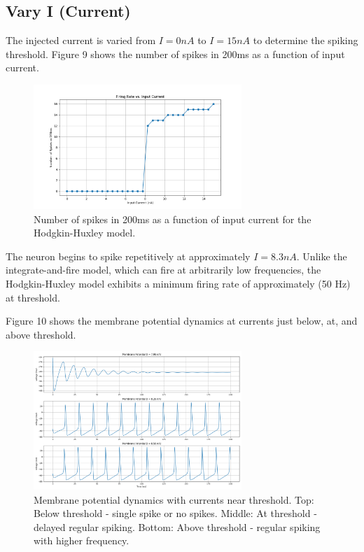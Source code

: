 \documentclass[11pt,a4paper]{article}
\begin{document}
\subsection{Vary I (Current)}

The injected current is varied from $I = 0nA$ to $I = 15nA$ to determine the spiking threshold. Figure 9 shows the number of spikes in 200ms as a function of input current.

\begin{figure}[H]
\centering
\includegraphics[width=0.7\textwidth]{fig9.png}
\caption{Number of spikes in 200ms as a function of input current for the Hodgkin-Huxley model.}
\label{fig:hh_firing_rate}
\end{figure}

The neuron begins to spike repetitively at approximately $I = 8.3nA$. Unlike the integrate-and-fire model, which can fire at arbitrarily low frequencies, the Hodgkin-Huxley model exhibits a minimum firing rate of approximately (50 Hz) at threshold. 

Figure 10 shows the membrane potential dynamics at currents just below, at, and above threshold.

\begin{figure}[H]
\centering
\includegraphics[width=0.7\textwidth]{fig10.png}
\caption{Membrane potential dynamics with currents near threshold. Top: Below threshold - single spike or no spikes. Middle: At threshold - delayed regular spiking. Bottom: Above threshold - regular spiking with higher frequency.}
\label{fig:hh_threshold}
\end{figure}
\end{document}
